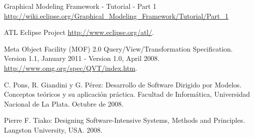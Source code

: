 \documentclass[a4paper,12pt,oneside,spanish]{book}
\begin{document}
\begin{thebibliography}{99}
 Graphical Modeling Framework - Tutorial - Part 1 \url{http://wiki.eclipse.org/Graphical_Modeling_Framework/Tutorial/Part_1}

 ATL Eclipse Project \url{http://www.eclipse.org/atl/}.

 Meta Object Facility (MOF) 2.0 Query/View/Transformation Specification. Version 1.1, January 2011 - Version 1.0, April 2008. \url{http://www.omg.org/spec/QVT/index.htm}.

 C. Pons, R. Giandini y G. Pérez: Desarrollo de Software Dirigido por Modelos. Conceptos teóricos y su aplicación práctica. Facultad de Informática, Universidad Nacional de La Plata. Octubre de 2008.

 Pierre F. Tiako: Designing Software-Intensive Systems, Methods and Principles. Langston University, USA. 2008.

\end{thebibliography}
\end{document}
